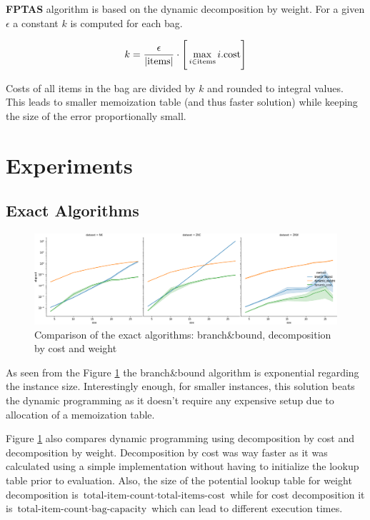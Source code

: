 \documentclass[a4paper,10pt]{article}
\begin{document}
\textbf{FPTAS} algorithm is based on the dynamic decomposition by weight. For a given $\epsilon$ a constant $k$ is computed for each bag. 

\begin{equation}
k = \frac{\epsilon}{|\textrm{items}|} \cdot \Bigg[\max_{i \in \small{\textrm{items}}} i.\textrm{cost}\Bigg]
\end{equation}

Costs of all items in the bag are divided by $k$ and rounded to integral values. This leads to smaller memoization table (and thus faster solution) while keeping the size of the error proportionally small.

\section{Experiments}

\subsection{Exact Algorithms}

\begin{figure}[!htb]
	\centering
  	\includegraphics[width=\textwidth]{images/exacts_comparison.png}
	\caption{Comparison of the exact algorithms: branch\&bound, decomposition by cost and weight}
	\label{exacts_comparison}
\end{figure}

As seen from the Figure \ref{exacts_comparison} the branch\&bound algorithm is exponential regarding the instance size. Interestingly enough, for smaller instances, this solution beats the dynamic programming as it doesn't require any expensive setup due to allocation of a memoization table.

Figure \ref{exacts_comparison} also compares dynamic programming using decomposition by cost and decomposition by weight. Decomposition by cost was way faster as it was calculated using a simple implementation without having to initialize the lookup table prior to evaluation. Also, the size of the potential lookup table for weight decomposition is $\textrm{total-item-count} \cdot \textrm{total-items-cost}$ while for cost decomposition it is $\textrm{total-item-count} \cdot \textrm{bag-capacity}$ which can lead to different execution times.
\end{document}
